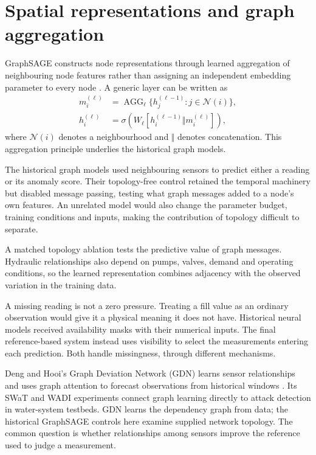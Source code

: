 \section{Spatial representations and graph aggregation}
GraphSAGE constructs node representations through learned aggregation of neighbouring node features rather than assigning an independent embedding parameter to every node \cite{graphsage}. A generic layer can be written as
\begin{align}
 m_i^{(\ell)} &= \operatorname{AGG}_{\ell}\{h_j^{(\ell-1)}:j\in\mathcal N(i)\},\\
 h_i^{(\ell)} &= \sigma\!\left(W_{\ell}[h_i^{(\ell-1)}\Vert m_i^{(\ell)}]\right),
\end{align}
where $\mathcal N(i)$ denotes a neighbourhood and $\Vert$ denotes concatenation. This aggregation principle underlies the historical graph models.

The historical graph models used neighbouring sensors to predict either a reading or its anomaly score. Their topology-free control retained the temporal machinery but disabled message passing, testing what graph messages added to a node's own features. An unrelated model would also change the parameter budget, training conditions and inputs, making the contribution of topology difficult to separate.

A matched topology ablation tests the predictive value of graph messages. Hydraulic relationships also depend on pumps, valves, demand and operating conditions, so the learned representation combines adjacency with the observed variation in the training data.

A missing reading is not a zero pressure. Treating a fill value as an ordinary observation would give it a physical meaning it does not have. Historical neural models received availability masks with their numerical inputs. The final reference-based system instead uses visibility to select the measurements entering each prediction. Both handle missingness, through different mechanisms.

Deng and Hooi's Graph Deviation Network (GDN) learns sensor relationships and uses graph attention to forecast observations from historical windows \cite{gdn2021}. Its SWaT and WADI experiments connect graph learning directly to attack detection in water-system testbeds. GDN learns the dependency graph from data; the historical GraphSAGE controls here examine supplied network topology. The common question is whether relationships among sensors improve the reference used to judge a measurement.

